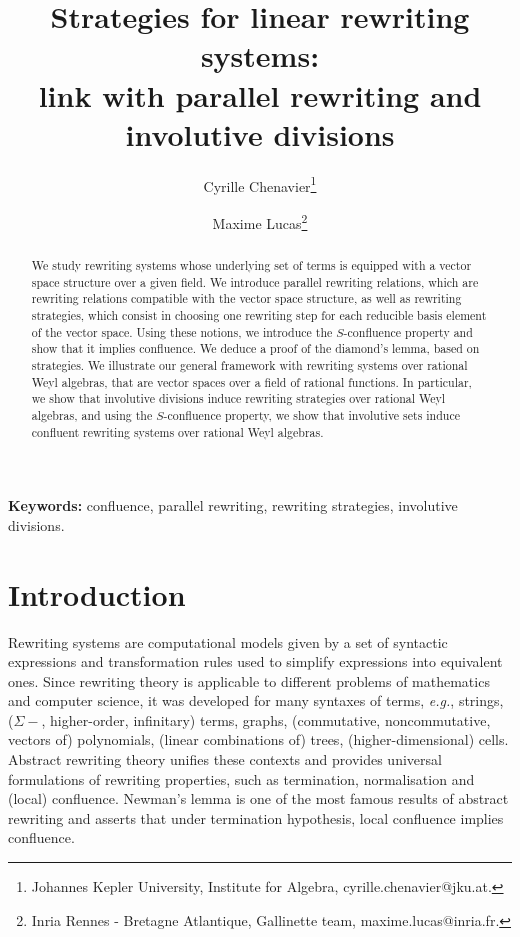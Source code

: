 \documentclass[11pt]{article}
\theoremstyle{definition}
\newcommand\eg{\emph{e.g.}}
\begin{document}
\title{Strategies for linear rewriting systems:\\[0.2cm]
 link with parallel rewriting and involutive divisions\vspace{0.5cm}}
\author{Cyrille Chenavier\footnote{
    Johannes Kepler University, Institute for Algebra,
    cyrille.chenavier@jku.at.
  }\and Maxime Lucas\footnote{Inria Rennes - Bretagne Atlantique,
    Gallinette team, maxime.lucas@inria.fr.}
  }
\date{}

\maketitle
      
\begin{abstract}
  We study rewriting systems whose underlying set of terms is equipped with a
  vector space structure over a given field. We introduce parallel rewriting
  relations, which are rewriting relations compatible with the vector space
  structure, as well as rewriting strategies, which consist in choosing one
  rewriting step for each reducible basis element of the vector space. Using
  these notions, we introduce the $S$-confluence property and show that it
  implies confluence. We deduce a proof of the diamond's lemma, based on
  strategies. We illustrate our general framework with rewriting systems over
  rational Weyl algebras, that are vector spaces over a field of rational
  functions. In particular, we show that involutive divisions induce rewriting
  strategies over rational Weyl algebras, and using the $S$-confluence property,
  we show that involutive sets induce confluent rewriting systems over rational
  Weyl algebras.
\end{abstract}
\noindent
\begin{small}\textbf{Keywords:} confluence, parallel rewriting, rewriting
  strategies, involutive divisions.
\end{small}

\tableofcontents

\section{Introduction}

Rewriting systems are computational models given by a set of syntactic
expressions and transformation rules used to simplify expressions into
equivalent ones. Since rewriting theory is applicable to different
problems of mathematics and computer science, it was developed for many
syntaxes of terms, \eg, strings, ($\Sigma-$, higher-order, infinitary)
terms, graphs, (commutative, noncommutative, vectors of) polynomials,
(linear combinations of) trees, (higher-dimensional) cells. Abstract
rewriting theory unifies these contexts and provides universal
formulations of rewriting properties, such as termination, normalisation
and (local) confluence. Newman's lemma is one of the most famous results 
of abstract rewriting and asserts that under termination hypothesis, 
local confluence implies confluence.
\medskip
\end{document}
